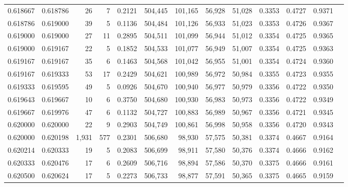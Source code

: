 \begin{tabular}{rrrrrrrrrrrrr}
0.618667 & 0.618786 &    26 &   7 &                                     0.2121 & 504,445 & 101,165 &  56,928 &  51,028 & 0.3353 & 0.4727 & 0.9371 \\
0.618786 & 0.619000 &    39 &   5 &                                     0.1136 & 504,484 & 101,126 &  56,933 &  51,023 & 0.3353 & 0.4726 & 0.9367 \\
0.619000 & 0.619000 &    27 &  11 &                                     0.2895 & 504,511 & 101,099 &  56,944 &  51,012 & 0.3354 & 0.4725 & 0.9365 \\
0.619000 & 0.619167 &    22 &   5 &                                     0.1852 & 504,533 & 101,077 &  56,949 &  51,007 & 0.3354 & 0.4725 & 0.9363 \\
0.619167 & 0.619167 &    35 &   6 &                                     0.1463 & 504,568 & 101,042 &  56,955 &  51,001 & 0.3354 & 0.4724 & 0.9360 \\
0.619167 & 0.619333 &    53 &  17 &                                     0.2429 & 504,621 & 100,989 &  56,972 &  50,984 & 0.3355 & 0.4723 & 0.9355 \\
0.619333 & 0.619595 &    49 &   5 &                                     0.0926 & 504,670 & 100,940 &  56,977 &  50,979 & 0.3356 & 0.4722 & 0.9350 \\
0.619643 & 0.619667 &    10 &   6 &                                     0.3750 & 504,680 & 100,930 &  56,983 &  50,973 & 0.3356 & 0.4722 & 0.9349 \\
0.619667 & 0.619976 &    47 &   6 &                                     0.1132 & 504,727 & 100,883 &  56,989 &  50,967 & 0.3356 & 0.4721 & 0.9345 \\
0.620000 & 0.620000 &    22 &   9 &                                     0.2903 & 504,749 & 100,861 &  56,998 &  50,958 & 0.3356 & 0.4720 & 0.9343 \\
0.620000 & 0.620198 & 1,931 & 577 &                                     0.2301 & 506,680 &  98,930 &  57,575 &  50,381 & 0.3374 & 0.4667 & 0.9164 \\
0.620214 & 0.620333 &    19 &   5 &                                     0.2083 & 506,699 &  98,911 &  57,580 &  50,376 & 0.3374 & 0.4666 & 0.9162 \\
0.620333 & 0.620476 &    17 &   6 &                                     0.2609 & 506,716 &  98,894 &  57,586 &  50,370 & 0.3375 & 0.4666 & 0.9161 \\
0.620500 & 0.620624 &    17 &   5 &                                     0.2273 & 506,733 &  98,877 &  57,591 &  50,365 & 0.3375 & 0.4665 & 0.9159 \\

\end{tabular}
